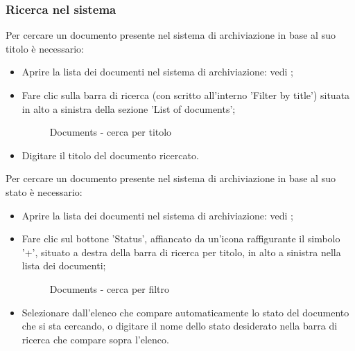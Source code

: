 \documentclass[10pt, a4paper]{article}
\begin{document}
\subsubsection{Ricerca nel sistema}
Per cercare un documento presente nel sistema di archiviazione in base al suo titolo è necessario:
\begin{itemize}
    \item Aprire la lista dei documenti nel sistema di archiviazione: vedi ;
    \item Fare clic sulla barra di ricerca (con scritto all'interno 'Filter by title') situata in alto a sinistra della sezione 'List of documents';
    \begin{figure}[H]
        \centering  
        \caption{Documents - cerca per titolo}
        \label{img:searchDocs}
    \end{figure}
    \item Digitare il titolo del documento ricercato.
\end{itemize}
Per cercare un documento presente nel sistema di archiviazione in base al suo stato è necessario:
\begin{itemize}
    \item Aprire la lista dei documenti nel sistema di archiviazione: vedi ;
    \item Fare clic sul bottone 'Status', affiancato da un'icona raffigurante il simbolo '+', situato a destra della barra di ricerca per titolo, in alto a sinistra nella lista dei documenti;
    \begin{figure}[H]
        \centering  
        \caption{Documents - cerca per filtro}
        \label{img:filterDocs}
    \end{figure}
    \item Selezionare dall'elenco che compare automaticamente lo stato del documento che si sta cercando, o digitare il nome dello stato desiderato nella barra di ricerca che compare sopra l'elenco.
\end{itemize}
\end{document}
